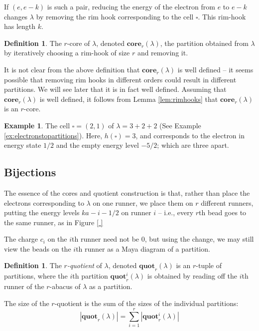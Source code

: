 \documentclass{amsart}[12pt]
\theoremstyle{definition}
\newtheorem{example}[dummy]{Example}
\newtheorem{definition}[dummy]{Definition}
\newcommand{\core}{\mathbf{core}}
\newcommand{\quot}{\mathbf{quot}}
\begin{document}
If $(e,e-k)$ is such a pair, reducing the energy of the electron from
$e$ to $e-k$ changes $\lambda$ by removing the
rim hook corresponding to the cell $\square$.  This rim-hook has
length $k$.


\begin{definition} 
The $r$-core of $\lambda$, denoted $\core_r(\lambda)$, the partition obtained from $\lambda$ by iteratively choosing a rim-hook of size $r$ and removing it.
\end{definition}

It is not clear from the above definition that $\core_r(\lambda)$ is well defined -- it seems possible that removing rim hooks in different orders could result in different partitions.  We will see later that it is in fact well defined.  Assuming that $\core_r(\lambda)$ is well defined, it follows from Lemma \ref{lem:rimhooks} that $\core_r(\lambda)$ is an $r$-core.


\begin{example}
The cell $\square=(2,1)$ of $\lambda=3+2+2$ (See Example \ref{ex:electronstopartitions}).
Here, $h(\square)=3$, and corresponds to the electron in energy state $1/2$
and the empty energy level $-5/2$; which are three apart.

\end{example}

\subsection{Bijections}

The essence of the cores and quotient construction is that, rather than place the electrons corresponding to $\lambda$ on one runner, we place them on $r$ different runners, putting the energy levels $ka-i-1/2$ on runner $i$ -- i.e., every $r$th bead goes to the same runner, as in Figure \ref{ }

The charge $c_i$ on the $i$th runner need not be 0, but using the change, we may still view the beads on the $i$th runner as a Maya diagram of a partition.  


\begin{definition} \label{def:quotients}
The \emph{$r$-quotient} of $\lambda$, denoted $\quot_r(\lambda)$ is an $r$-tuple of partitions, where the $i$th partition $\quot_r^i(\lambda)$ is obtained by reading off the $i$th runner of the $r$-abacus of $\lambda$ as a partition.

The size of the $r$-quotient is the sum of the sizes of the individual partitions: 
$$|\quot_r(\lambda)|=\sum_{i=1}^r |\quot_r^i(\lambda)|$$
\end{definition}
\end{document}
